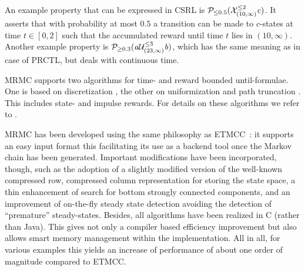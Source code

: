 \documentclass[times, 10pt,twocolumn]{article}
\newcommand{\Prob}[3]{{\cal P}_{#1 #2}(#3)}
\begin{document}
An example property that can be expressed in CSRL is 
$\Prob{\leq}{0.5}{{\cal X}^{\leq 2}_{(10, \infty )} {\it c}}$. It asserts
that with probability at most $0.5$ a transition can be made
to $c$-states at time $t \in \left[0,2\right]$ such that the
accumulated reward until time $t$ lies in $\left(10, \infty \right)$.
Another example property is
$\Prob{\geq}{0.3}{{\it a}{\cal U}^{\leq 3}_{(23, \infty )} {\it b}}$,
which has the same meaning as in case of PRCTL, but deals with continuous
time.

MRMC supports two algorithms for time- and reward bounded until-formulae.
One is based on discretization \cite{TijmsV_99}, the other on uniformization and path
truncation \cite{QureshiS_ISFTC96}. This includes state- and impulse rewards. For details on
these algorithms we refer to \cite{BaierHHK_ICALP00,HaverkortCHKB_DSN02,ClothKKP_DSN05}.


MRMC has been developed using the same philosophy as ETMCC~\cite{HermansKMS_IJSTTT03}: it supports
an easy input format this facilitating its use as a backend tool once
the Markov chain has been generated.
Important modifications have been incorporated, though, such as the adoption
of a slightly modified version of the well-known compressed row, compressed
column representation for storing the state space, a thin enhancement of search for bottom strongly
connected components, and an improvement of on-the-fly steady state detection avoiding
the detection of ``premature'' steady-states.
Besides, all algorithms have been realized in C (rather than Java). This gives not only
a compiler based efficiency improvement but also allows smart memory management within the
implementation.
All in all, for various examples this yields an increase of performance of 
about one order of magnitude compared to ETMCC.
\end{document}
